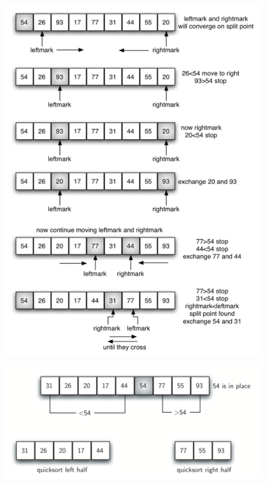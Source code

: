 \documentclass[a4paper,11pt]{book}
\begin{document}
\begin{figure}[ht]
	\centering
	\includegraphics[scale=1.2]{code/sort/pic/partitionA.png}
\end{figure}

\begin{figure}[ht]
	\centering
	\includegraphics[scale=1.2]{code/sort/pic/partitionB.png}
\end{figure}
\end{document}
